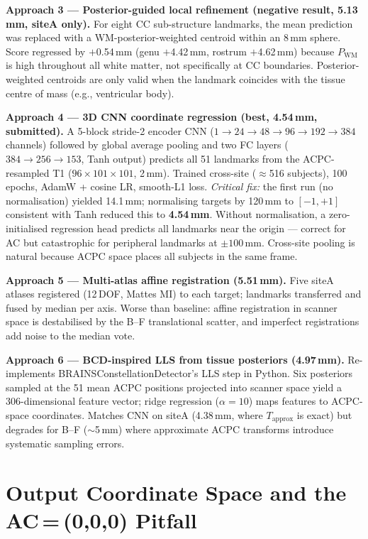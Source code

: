 \documentclass[11pt,letterpaper]{article}
\begin{document}
\textbf{Approach 3 — Posterior-guided local refinement (negative result, 5.13\,mm, siteA only).}
For eight CC sub-structure landmarks, the mean prediction was replaced with a
WM-posterior-weighted centroid within an 8\,mm sphere.
Score regressed by $+$0.54\,mm (genu $+$4.42\,mm, rostrum $+$4.62\,mm) because
$P_\text{WM}$ is high throughout all white matter, not specifically at CC boundaries.
Posterior-weighted centroids are only valid when the landmark coincides with the tissue
centre of mass (e.g., ventricular body).

\textbf{Approach 4 — 3D CNN coordinate regression (best, 4.54\,mm, submitted).}
A 5-block stride-2 encoder CNN ($1{\to}24{\to}48{\to}96{\to}192{\to}384$ channels)
followed by global average pooling and two FC layers ($384{\to}256{\to}153$, Tanh output)
predicts all 51 landmarks from the ACPC-resampled T1 ($96{\times}101{\times}101$, 2\,mm).
Trained cross-site ($\approx$516 subjects), 100 epochs, AdamW + cosine LR, smooth-L1 loss.
\emph{Critical fix:} the first run (no normalisation) yielded 14.1\,mm; normalising targets
by 120\,mm to $[-1,+1]$ consistent with Tanh reduced this to \textbf{4.54\,mm}.
Without normalisation, a zero-initialised regression head predicts all landmarks near the
origin — correct for AC but catastrophic for peripheral landmarks at $\pm100$\,mm.
Cross-site pooling is natural because ACPC space places all subjects in the same frame.

\textbf{Approach 5 — Multi-atlas affine registration (5.51\,mm).}
Five siteA atlases registered (12\,DOF, Mattes MI) to each target; landmarks transferred
and fused by median per axis.
Worse than baseline: affine registration in scanner space is destabilised by the B--F
translational scatter, and imperfect registrations add noise to the median vote.

\textbf{Approach 6 — BCD-inspired LLS from tissue posteriors (4.97\,mm).}
Re-implements BRAINSConstellationDetector's \cite{johnson2007brainsfit} LLS step in Python.
Six posteriors sampled at the 51 mean ACPC positions projected into scanner space yield a
306-dimensional feature vector; ridge regression ($\alpha=10$) maps features to ACPC-space
coordinates.
Matches CNN on siteA (4.38\,mm, where $T_\text{approx}$ is exact) but degrades for B--F
($\sim$5\,mm) where approximate ACPC transforms introduce systematic sampling errors.

\section{Output Coordinate Space and the AC\,=\,(0,0,0) Pitfall}
\label{sec:coords}
\end{document}

